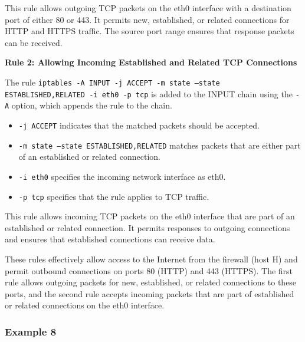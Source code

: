 {{		This rule allows outgoing TCP packets on the eth0 interface with a destination port of either 80 or 443. It permits new, established, or related connections for HTTP and HTTPS traffic. The source port range ensures that response packets can be received.
		
		\textbf{Rule 2: Allowing Incoming Established and Related TCP Connections}
		
		The rule \texttt{iptables -A INPUT -j ACCEPT -m state --state ESTABLISHED,RELATED -i eth0 -p tcp} is added to the INPUT chain using the \texttt{-A} option, which appends the rule to the chain.
		
		\begin{itemize}
			\item \texttt{-j ACCEPT} indicates that the matched packets should be accepted.
			\item \texttt{-m state --state ESTABLISHED,RELATED} matches packets that are either part of an established or related connection.
			\item \texttt{-i eth0} specifies the incoming network interface as eth0.
			\item \texttt{-p tcp} specifies that the rule applies to TCP traffic.
		\end{itemize}
		
		This rule allows incoming TCP packets on the eth0 interface that are part of an established or related connection. It permits responses to outgoing connections and ensures that established connections can receive data.
		
		These rules effectively allow access to the Internet from the firewall (host H) and permit outbound connections on ports 80 (HTTP) and 443 (HTTPS). The first rule allows outgoing packets for new, established, or related connections to these ports, and the second rule accepts incoming packets that are part of established or related connections on the eth0 interface.}	
	\newpage		
	\subsubsection{Example 8}
	
}

